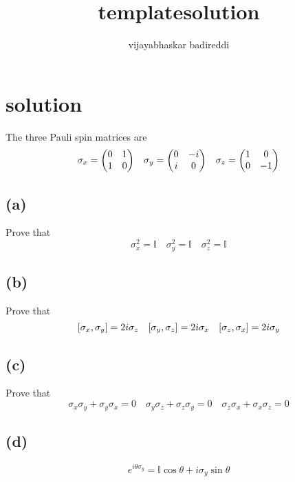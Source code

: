 \documentclass[12pt] {article}
\title{templatesolution}
\author{vijayabhaskar badireddi}
\begin{document}
        
\section*{solution}
The three Pauli spin matrices are 
\[\sigma_x=\mqty(0 & 1 \\ 1 & 0)\quad\sigma_y=\mqty(0 & -i \\ i & 0)\quad\sigma_z=\mqty(1 & 0 \\ 0 & -1)\]
\subsection*{(a)}
Prove that 
\[\sigma_x^2=\mathbb{I}\quad\sigma_y^2=\mathbb{I}\quad\sigma_z^2=\mathbb{I}\]
\subsection*{(b)}
Prove that
\[\comm{\sigma_x}{\sigma_y}=2i\sigma_z\quad\comm{\sigma_y}{\sigma_z}=2i\sigma_x\quad\comm{\sigma_z}{\sigma_x}=2i\sigma_y\]
\subsection*{(c)}
Prove that
\[\sigma_x\sigma_y+\sigma_y\sigma_x=0\quad\sigma_y\sigma_z+\sigma_z\sigma_y=0\quad\sigma_z\sigma_x+\sigma_x\sigma_z=0\]
\subsection*{(d)}
\[e^{i\theta\sigma_y}=\mathbb{I}\cos\theta+i\sigma_y\sin\theta\]
\end{document}
